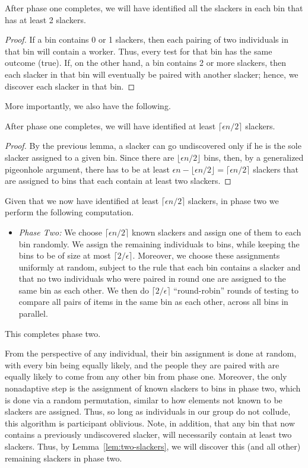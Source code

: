 \documentclass[11pt]{llncs}
\begin{document}
\begin{lemma}
\label{lem:two-slackers}
After phase one completes, we will have
identified all the slackers in each bin that has at least 2 slackers.
\end{lemma}
\begin{proof}
If a bin contains 0 or 1 slackers, then each pairing of two individuals in that bin will contain a worker. Thus, every test for that 
bin has the same outcome (true).
If, on the other hand, a bin contains 2 or more slackers, then each slacker 
in that bin
will eventually be paired with another slacker; hence, we discover each
slacker in that bin.
\end{proof}

More importantly, we also have the following.

\begin{lemma}
After phase one completes, we will have
identified at least $\lceil \epsilon n/2\rceil$
slackers.
\end{lemma}
\begin{proof}
By the previous lemma, a slacker can go undiscovered only if he is the sole
slacker assigned to a given bin.
Since there are $\lfloor \epsilon n/2\rfloor$ bins, then,
by a generalized pigeonhole argument, there has to be 
at least $\epsilon n - \lfloor \epsilon n/2\rfloor = \lceil \epsilon n/2\rceil$
slackers that are assigned to bins that each contain at least two slackers.
\end{proof}

Given that we now have identified at least $\lceil \epsilon n/2\rceil$
slackers, in phase two we perform the following computation.
\begin{itemize}
\item
\emph{Phase Two:}
We choose $\lceil \epsilon n/2\rceil$ known slackers and assign one of them to each bin randomly.
We assign the remaining individuals to bins, while keeping the bins to be of size
at most $\lceil 2/\epsilon\rceil$.
Moreover, we choose these assignments uniformly at random, 
subject to the rule that each
bin contains a slacker and that no two individuals who were paired in round one are assigned to the same bin as each other.
We then do $\lceil 2/\epsilon\rceil$ 
``round-robin'' rounds of testing to compare all pairs of
items in the same bin as each other, across all bins in parallel. 
\end{itemize}
This completes phase two. 

From the perspective of any individual, their bin
assignment 
is done at random, with every bin being equally likely, and the people they are paired with are equally likely to come from any other bin from phase one.
Moreover, the only nonadaptive step is the assignment of known slackers to
bins in phase two, which is done via a random permutation, similar to how
elements not known to be slackers are assigned.
Thus, so long as individuals in our group do not collude, this algorithm is
participant oblivious.
Note, in addition, that any bin that now contains a previously undiscovered
slacker, will necessarily contain at least two slackers.
Thus, by Lemma~\ref{lem:two-slackers},
we will discover this (and all other) remaining slackers in phase two.
\end{document}
